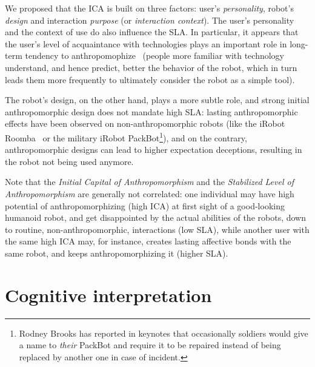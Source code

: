 \documentclass{sig-alternate-2013}
\begin{document}
We proposed that the ICA is built on three factors: user's \emph{personality},
robot's \emph{design} and interaction \emph{purpose} (or \emph{interaction
context}). The user's personality and the context of use do also influence the
SLA. In particular, it appears that the user's level of acquaintance with
technologies plays an important role in long-term tendency to
anthropomophize~\cite{fink_living_2013} (people more familiar with technology
understand, and hence predict, better the behavior of the robot, which in turn
leads them more frequently to ultimately consider the robot as a simple tool).

The robot's design, on the other hand, plays a more subtle role, and strong
initial anthropomorphic design does not mandate high SLA: lasting
anthropomorphic effects have been observed on non-anthropomorphic robots (like
the iRobot Roomba~\cite{fink_living_2013} or the military iRobot
PackBot\footnote{Rodney Brooks has reported in keynotes that occasionally
soldiers would give a name to \emph{their} PackBot and require it to be repaired
instead of being replaced by another one in case of incident.}), and on the
contrary, anthropomorphic designs can lead to higher expectation deceptions,
resulting in the robot not being used anymore.

Note that the \emph{Initial Capital of Anthropomorphism} and the
\emph{Stabilized Level of Anthropomorphism} are generally not correlated: one
individual may have high potential of anthropomorphizing (high ICA) at first
sight of a good-looking humanoid robot, and get disappointed by the actual
abilities of the robots, down to routine, non-anthropomorphic, interactions
(low SLA), while another user with the same high ICA may, for instance, creates
lasting affective bonds with the same robot, and keeps anthropomorphizing it
(higher SLA).


\section{Cognitive interpretation}
\label{sec:cognitivemodel}
\end{document}
